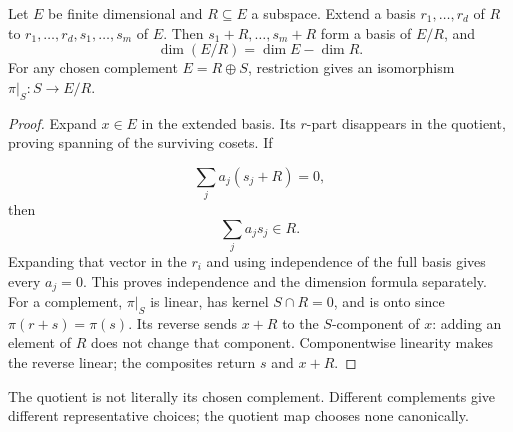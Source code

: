 \begin{proposition}\label{prop:quotient-basis}
Let $E$ be finite dimensional and $R\subseteq E$ a subspace. Extend a
basis $r_1,\ldots,r_d$ of $R$ to $r_1,\ldots,r_d,s_1,\ldots,s_m$ of $E$.
Then $s_1+R,\ldots,s_m+R$ form a basis of $E/R$, and
\[
\dim(E/R)=\dim E-\dim R.
\]
For any chosen complement $E=R\oplus S$, restriction gives an isomorphism
$\pi|_S:S\to E/R$.
\end{proposition}
\begin{proof}
Expand $x\in E$ in the extended basis. Its $r$-part disappears in the
quotient, proving spanning of the surviving cosets. If

\[
\sum_j a_j(s_j+R)=0,
\]
 then
\[
\sum_j a_js_j\in R.
\]
 Expanding that vector
in the $r_i$ and using independence of the full basis gives every $a_j=0$.
This proves independence and the dimension formula separately.
For a complement, $\pi|_S$ is linear, has kernel $S\cap R=0$, and is onto
since $\pi(r+s)=\pi(s)$. Its reverse sends $x+R$ to the $S$-component of $x$:
adding an element of $R$ does not change that component. Componentwise
linearity makes the reverse linear; the composites return $s$ and $x+R$.
\end{proof}
The quotient is not literally its chosen complement. Different complements
give different representative choices; the quotient map chooses none canonically.

